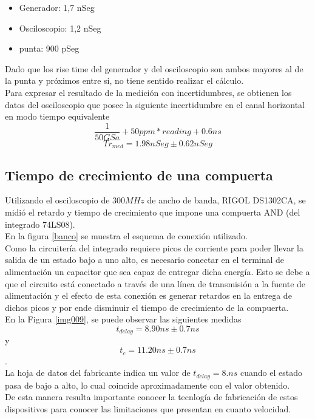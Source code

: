 \documentclass[a4paper,10pt]{article}
\begin{document}
		\begin{itemize}
			\item Generador: 1,7 nSeg  
			\item Osciloscopio: 1,2 nSeg
			\item punta: 900 pSeg
		\end{itemize}
		\indent Dado que los rise time del generador y del osciloscopio son 
		ambos mayores al de la punta y próximos entre si, no tiene sentido 
		realizar el cálculo. \\
		\indent Para expresar el resultado de la medición con incertidumbres,
		se obtienen los datos del osciloscopio que posee la siguiente 
		incertidumbre en el canal horizontal en modo tiempo equivalente
		$$ \frac{1}{50GSa} + 50ppm * reading + 0.6 ns$$
		$$ Tr_{med} = 1.98 nSeg \pm 0.62 nSeg$$
		
	\subsection{Tiempo de crecimiento de una compuerta}
			\indent Utilizando el osciloscopio de $300MHz$ de ancho de banda, RIGOL 
			DS1302CA, se midi\'o el retardo y tiempo de crecimiento que impone una 
			compuerta AND (del integrado 74LS08). \\
			\indent En la figura \ref{banco} se muestra el esquema de conexi\'on 
			utilizado. \\
		 	\indent Como la circuitería del integrado requiere picos de corriente para 
			poder llevar la salida de un estado bajo a uno alto, es necesario conectar 
			en el terminal de alimentación un capacitor que sea capaz de entregar dicha 
			energía. Esto se debe a que el circuito está conectado a través de una línea
			de transmisión a la fuente de alimentación y el efecto de esta conexión es 
			generar retardos en la entrega de dichos picos y por ende disminuir el 
			tiempo de crecimiento de la compuerta.\\
			\indent En la Figura \ref{img009}, se puede observar las siguientes medidas 
			$$t_{delay}=8.90ns \pm0.7ns$$y  $$t_{c}=11.20ns\pm0.7ns$$. \\
			\indent La hoja de datos del fabricante indica un valor de $t_{delay}=8.ns$ 
			cuando el estado pasa de bajo a alto, lo cual coincide aproximadamente con 
			el valor obtenido. \\
			\indent De esta manera resulta importante conocer la tecnlog\'ia de 
			fabricaci\'on de estos dispositivos para conocer las limitaciones que 
			presentan en cuanto velocidad.
			
\end{document}

